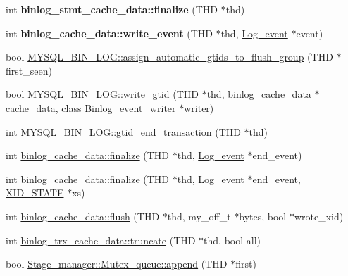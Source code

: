 \begin{DoxyCompactItemize}
int {\bfseries binlog\+\_\+stmt\+\_\+cache\+\_\+data\+::finalize} (T\+HD $\ast$thd)
\item 
\mbox{\label{group__Binary__Log_gac3a0b36dc3c576520f72b80298791400}} 
int {\bfseries binlog\+\_\+cache\+\_\+data\+::write\+\_\+event} (T\+HD $\ast$thd, \mbox{\hyperlink{classLog__event}{Log\+\_\+event}} $\ast$event)
\item 
bool \mbox{\hyperlink{group__Binary__Log_gacface590afa692fc84446cde6f104231}{M\+Y\+S\+Q\+L\+\_\+\+B\+I\+N\+\_\+\+L\+O\+G\+::assign\+\_\+automatic\+\_\+gtids\+\_\+to\+\_\+flush\+\_\+group}} (T\+HD $\ast$first\+\_\+seen)
\item 
bool \mbox{\hyperlink{group__Binary__Log_gabc6da7d051531ecf891a1fe631697f38}{M\+Y\+S\+Q\+L\+\_\+\+B\+I\+N\+\_\+\+L\+O\+G\+::write\+\_\+gtid}} (T\+HD $\ast$thd, \mbox{\hyperlink{classbinlog__cache__data}{binlog\+\_\+cache\+\_\+data}} $\ast$cache\+\_\+data, class \mbox{\hyperlink{classBinlog__event__writer}{Binlog\+\_\+event\+\_\+writer}} $\ast$writer)
\item 
int \mbox{\hyperlink{group__Binary__Log_ga4e7e658ba27b48710cf57e3f8a8253e4}{M\+Y\+S\+Q\+L\+\_\+\+B\+I\+N\+\_\+\+L\+O\+G\+::gtid\+\_\+end\+\_\+transaction}} (T\+HD $\ast$thd)
\item 
int \mbox{\hyperlink{group__Binary__Log_ga3367fa8c1daced18065f6b9dea5385fe}{binlog\+\_\+cache\+\_\+data\+::finalize}} (T\+HD $\ast$thd, \mbox{\hyperlink{classLog__event}{Log\+\_\+event}} $\ast$end\+\_\+event)
\item 
int \mbox{\hyperlink{group__Binary__Log_ga16bd8b16b092443137c073f18c7e11e4}{binlog\+\_\+cache\+\_\+data\+::finalize}} (T\+HD $\ast$thd, \mbox{\hyperlink{classLog__event}{Log\+\_\+event}} $\ast$end\+\_\+event, \mbox{\hyperlink{classXID__STATE}{X\+I\+D\+\_\+\+S\+T\+A\+TE}} $\ast$xs)
\item 
int \mbox{\hyperlink{group__Binary__Log_ga302d2ea7bfcbea015c329edacdac6c5a}{binlog\+\_\+cache\+\_\+data\+::flush}} (T\+HD $\ast$thd, my\+\_\+off\+\_\+t $\ast$bytes, bool $\ast$wrote\+\_\+xid)
\item 
int \mbox{\hyperlink{group__Binary__Log_gae0d03425fee2a702a9b4dfac7b9de4b1}{binlog\+\_\+trx\+\_\+cache\+\_\+data\+::truncate}} (T\+HD $\ast$thd, bool all)
\item 
bool \mbox{\hyperlink{group__Binary__Log_ga20a543666e684f08da1cc093d5fa70ec}{Stage\+\_\+manager\+::\+Mutex\+\_\+queue\+::append}} (T\+HD $\ast$first)
\item 
\mbox{\label{group__Binary__Log_gac617a778e2de5141ba0d25ca33ccac78}} 

\end{DoxyCompactItemize}
